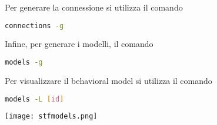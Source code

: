 \documentclass[../main.tex]{subfiles}
\begin{document}
Per generare la connessione si utilizza il comando
\begin{lstlisting}[language=bash]
	connections -g	
\end{lstlisting}

Infine, per generare i modelli, il comando
\begin{lstlisting}[language=bash]
	models -g	
\end{lstlisting}

Per visualizzare il behavioral model si utilizza il comando
\begin{lstlisting}[language=bash]
	models -L [id]	
\end{lstlisting}
\texttt{[image: stfmodels.png]}
\end{document}
